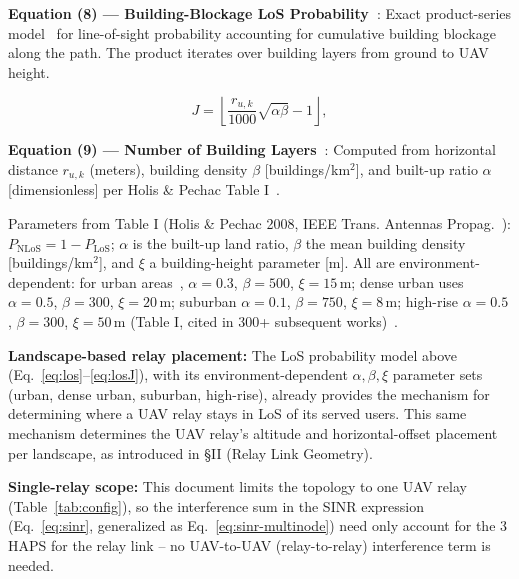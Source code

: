 \documentclass[conference]{IEEEtran}
\begin{document}
\noindent\textbf{Equation (8) --- Building-Blockage LoS Probability~\cite{holispechac2008}}: Exact product-series model~\cite{holispechac2008} for line-of-sight probability accounting for cumulative building blockage along the path. The product iterates over building layers from ground to UAV height.

\begin{equation}
J = \left\lfloor \frac{r_{u,k}}{1000}\sqrt{\alpha\beta} - 1 \right\rfloor,
\label{eq:losJ}
\end{equation}

\noindent\textbf{Equation (9) --- Number of Building Layers~\cite{holispechac2008}}: Computed from horizontal distance $r_{u,k}$ (meters), building density $\beta$ [buildings/km$^2$], and built-up ratio $\alpha$ [dimensionless] per Holis \& Pechac Table I~\cite{holispechac2008}.

\noindent Parameters from Table I (Holis \& Pechac 2008, IEEE Trans. Antennas Propag.~\cite{holispechac2008}): $P_\mathrm{NLoS}=1-P_\mathrm{LoS}$; $\alpha$ is the built-up land ratio,
$\beta$ the mean building density [buildings/km$^2$], and $\xi$ a building-height parameter [m]. All are
environment-dependent: for urban areas~\cite{holispechac2008},
$\alpha=0.3$, $\beta=500$, $\xi=15$\,m; dense urban uses $\alpha=0.5$, $\beta=300$, $\xi=20$\,m;
suburban $\alpha=0.1$, $\beta=750$, $\xi=8$\,m; high-rise $\alpha=0.5$, $\beta=300$, $\xi=50$\,m (Table I, cited in 300+ subsequent works)~\cite{holispechac2008}.

\noindent\textbf{Landscape-based relay placement:} The LoS probability model above (Eq.~\eqref{eq:los}--\eqref{eq:losJ}), with its environment-dependent $\alpha,\beta,\xi$ parameter sets (urban, dense urban, suburban, high-rise), already provides the mechanism for determining where a UAV relay stays in LoS of its served users. This same mechanism determines the UAV relay's altitude and horizontal-offset placement per landscape, as introduced in \S II (Relay Link Geometry).

\noindent\textbf{Single-relay scope:} This document limits the topology to one UAV relay (Table~\ref{tab:config}), so the interference sum in the SINR expression (Eq.~\eqref{eq:sinr}, generalized as Eq.~\eqref{eq:sinr-multinode}) need only account for the 3 HAPS for the relay link -- no UAV-to-UAV (relay-to-relay) interference term is needed.
\end{document}
